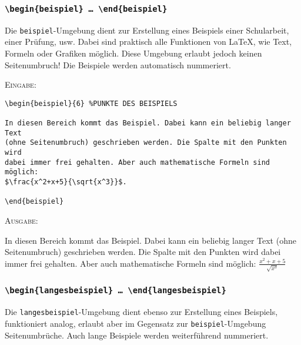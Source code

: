 \documentclass[a4paper,12pt]{article}
\begin{document}
\vspace{1cm}
\subsubsection{\texttt{\textbackslash begin\{beispiel\} \ldots\ \textbackslash end\{beispiel\}}}

Die \texttt{beispiel}-Umgebung dient zur Erstellung eines Beispiels einer Schularbeit, einer Prüfung, usw. Dabei sind praktisch alle Funktionen von \LaTeX, wie Text, Formeln oder Grafiken möglich. Diese Umgebung erlaubt jedoch keinen Seitenumbruch! Die Beispiele werden automatisch nummeriert.

\leer

\textsc{Eingabe:}
\begin{verbatim}
\begin{beispiel}{6} %PUNKTE DES BEISPIELS

In diesen Bereich kommt das Beispiel. Dabei kann ein beliebig langer Text
(ohne Seitenumbruch) geschrieben werden. Die Spalte mit den Punkten wird 
dabei immer frei gehalten. Aber auch mathematische Formeln sind möglich:
$\frac{x^2+x+5}{\sqrt{x^3}}$.

\end{beispiel}
\end{verbatim}

\leer

\textsc{Ausgabe:}\leer

\begin{beispiel}{6} %
In diesen Bereich kommt das Beispiel. Dabei kann ein beliebig langer Text
(ohne Seitenumbruch) geschrieben werden. Die Spalte mit den Punkten wird dabei 
immer frei gehalten. Aber auch mathematische Formeln sind möglich:
$\frac{x^2+x+5}{\sqrt{x^3}}$
\end{beispiel}

%
\vspace{1cm}

\subsubsection{\texttt{\textbackslash begin\{langesbeispiel\} \ldots\ \textbackslash end\{langesbeispiel\}}}

Die \texttt{langesbeispiel}-Umgebung dient ebenso zur Erstellung eines Beispiels, funktioniert analog, erlaubt aber im Gegensatz zur \texttt{beispiel}-Umgebung Seitenumbrüche. Auch lange Beispiele werden weiterführend nummeriert.

\leer
\end{document}
